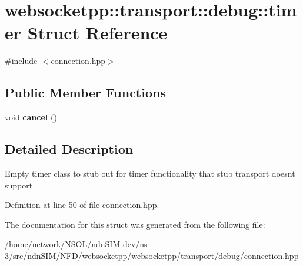 \hypertarget{structwebsocketpp_1_1transport_1_1debug_1_1timer}{}\section{websocketpp\+:\+:transport\+:\+:debug\+:\+:timer Struct Reference}
\label{structwebsocketpp_1_1transport_1_1debug_1_1timer}


{\ttfamily \#include $<$connection.\+hpp$>$}

\subsection*{Public Member Functions}
\begin{DoxyCompactItemize}
\item 
void {\bfseries cancel} ()\hypertarget{structwebsocketpp_1_1transport_1_1debug_1_1timer_a09a9366c12bd79dc2496a07794e3f17e}{}\label{structwebsocketpp_1_1transport_1_1debug_1_1timer_a09a9366c12bd79dc2496a07794e3f17e}

\end{DoxyCompactItemize}


\subsection{Detailed Description}
Empty timer class to stub out for timer functionality that stub transport doesn\textquotesingle{}t support 

Definition at line 50 of file connection.\+hpp.



The documentation for this struct was generated from the following file\+:\begin{DoxyCompactItemize}
\item 
/home/network/\+N\+S\+O\+L/ndn\+S\+I\+M-\/dev/ns-\/3/src/ndn\+S\+I\+M/\+N\+F\+D/websocketpp/websocketpp/transport/debug/connection.\+hpp\end{DoxyCompactItemize}
